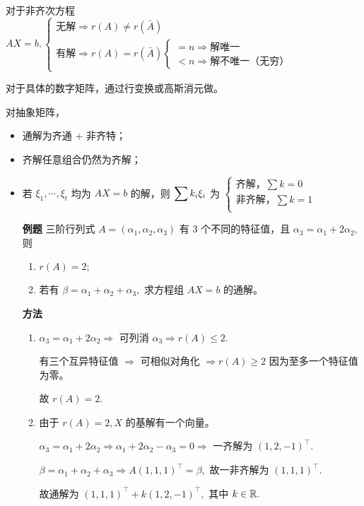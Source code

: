 对于非齐次方程 $ AX = b,\begin{cases}
    \textrm{无解}\Rightarrow r(A) \neq r(\bar A)\\ 
    \textrm{有解}\Rightarrow r(A) = r(\bar A)
    \begin{cases}
         = n \Rightarrow \textrm{解唯一}\\ 
         < n \Rightarrow \textrm{解不唯一（无穷）}
    \end{cases}
\end{cases} $ 


对于具体的数字矩阵，通过行变换或高斯消元做。

对抽象矩阵，
\begin{itemize}
    \item 通解为齐通 + 非齐特；
    \item 齐解任意组合仍然为齐解；
    \item 若 $ \xi_1,\cdots,\xi_t $ 均为 $ AX = b $ 的解，则
    $ \displaystyle \sum k_i\xi_i $ 为 $ \begin{cases}
        \textrm{齐解，} \sum k = 0 \\
        \textrm{非齐解，} \sum k = 1 \\
    \end{cases} $ 
\end{itemize}

\begin{itemize}
    \item[\textbf{例题}] 三阶行列式 $ A = (\alpha_1,\alpha_2,\alpha_3) $ 有 $ 3 $ 个不同的特征值，且 $ \alpha_3 = \alpha_1+
    2\alpha_2, $ 则
    \begin{enumerate}[label = \Roman*.]
        \item $ r(A) = 2; $ 
        \item 若有 $ \beta = \alpha_1+\alpha_2+\alpha_3, $ 求方程组 $ AX = b $ 的通解。
    \end{enumerate}
    \item[\textbf{方法}]
    \begin{enumerate}[label = \Roman*.]
        \item $ \alpha_3 = \alpha_1 + 2\alpha_2\Rightarrow $ 可列消 $ \alpha_3 \Rightarrow r(A) \leq 2. $  
        
        有三个互异特征值 $ \Rightarrow $ 可相似对角化 $ \Rightarrow r(A) \geq 2 $ 因为至多一个特征值为零。

        故 $ r(A) = 2. $ 
        \item 由于 $ r(A) = 2, X $ 的基解有一个向量。
        
        $ \alpha_3 = \alpha_1 + 2\alpha_2\Rightarrow \alpha_1 + 2\alpha_2-\alpha_3 = 0
        \Rightarrow $ 一齐解为 $ (1,2,-1)^\top. $ 

        $ \beta = \alpha_1+\alpha_2+\alpha_3 \Rightarrow A(1,1,1)^\top = \beta, $ 
        故一非齐解为 $ (1,1,1)^\top. $ 

        故通解为 $ (1,1,1)^\top + k(1,2,-1)^\top, $ 其中 $ k\in \mathbb R. $ 
    \end{enumerate}
\end{itemize}

